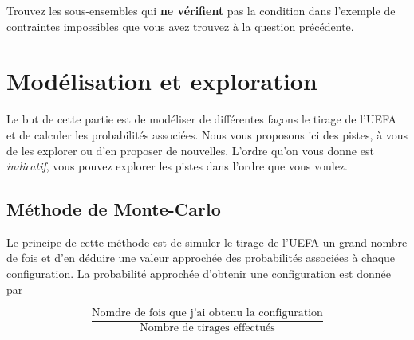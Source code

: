 \documentclass{../ficheTDTP}
\begin{document}
\begin{enumerate}
\begin{enumerate}
Trouvez les sous-ensembles qui \textbf{ne vérifient} pas la condition dans l'exemple de contraintes impossibles que vous avez trouvez à la question précédente.
\end{enumerate} 
\end{enumerate}




\section{Modélisation et exploration}

Le but de cette partie est de modéliser de différentes façons le tirage de l'UEFA et de calculer les probabilités associées. Nous vous proposons ici des pistes, à vous de les explorer ou d'en proposer de nouvelles. L'ordre qu'on vous donne est \textit{indicatif}, vous pouvez explorer les pistes dans l'ordre que vous voulez. 

\subsection{Méthode de Monte-Carlo}

Le principe de cette méthode est de simuler le tirage de l'UEFA un grand nombre de fois et d'en déduire une valeur approchée des probabilités associées à chaque configuration. La probabilité approchée d'obtenir une configuration est donnée par 

\begin{equation*}
\frac{\text{Nomdre de fois que j'ai obtenu la configuration}}{\text{Nombre de tirages effectués}}
\end{equation*}
\end{document}
